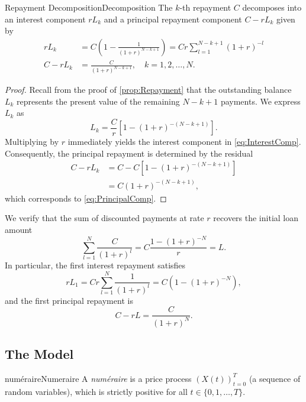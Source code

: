 \begin{prop}{Repayment Decomposition}{Decomposition}
	The $k$-th repayment $C$ decomposes into an interest component $rL_k$ and a principal repayment component $C - rL_k$ given by
	\begin{align}
		rL_k     & = C \left( 1 - \frac{1}{(1+r)^{N-k+1}} \right) = C r \sum_{l=1}^{N-k+1} (1+r)^{-l} \label{eq:InterestComp} \\
		C - rL_k & = \frac{C}{(1+r)^{N-k+1}}, \quad k=1, 2, \dots, N. \label{eq:PrincipalComp}
	\end{align}
\end{prop}

\begin{proof}
	Recall from the proof of \ref{prop:Repayment} that the outstanding balance $L_k$ represents the present value of the remaining $N-k+1$ payments. We express $L_k$ as
	\begin{equation}
		L_k = \frac{C}{r} \left[ 1 - (1+r)^{-(N-k+1)} \right].
	\end{equation}
	Multiplying by $r$ immediately yields the interest component in \cref{eq:InterestComp}. Consequently, the principal repayment is determined by the residual
	\begin{align}
		C - rL_k & = C - C \left[ 1 - (1+r)^{-(N-k+1)} \right] \nonumber \\
		         & = C (1+r)^{-(N-k+1)},
	\end{align}
	which corresponds to \cref{eq:PrincipalComp}.
\end{proof}

\noindent We verify that the sum of discounted payments at rate $r$ recovers the initial loan amount
\begin{equation}
	\sum_{l=1}^{N} \frac{C}{(1+r)^l} = C \frac{1 - (1+r)^{-N}}{r} = L.
\end{equation}
In particular, the first interest repayment satisfies
\begin{equation}
	rL_1 = C r \sum_{l=1}^{N} \frac{1}{(1+r)^l} = C \left( 1 - (1+r)^{-N} \right),
\end{equation}
and the first principal repayment is
\begin{equation}
	C - rL = \frac{C}{(1+r)^N}.
\end{equation}

\subsection{The Model}
\begin{defn}{num\'{e}raire}{Numeraire}
	A \emph{num\'{e}raire} is a price process $(X(t))_{t=0}^T$ (a sequence of random variables), which is strictly positive for all $t \in \{0, 1, \dots, T\}$.
\end{defn}

